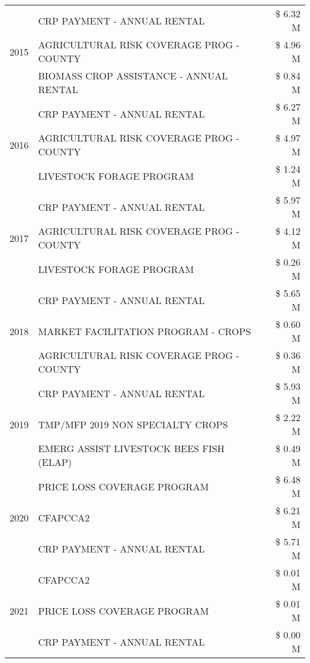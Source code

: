\begin{tabular}{llr}
\cline{1-3}
\multirow[t]{3}{*}{2015} & CRP PAYMENT - ANNUAL RENTAL & \$ 6.32 M \\
 & AGRICULTURAL RISK COVERAGE PROG - COUNTY & \$ 4.96 M \\
 & BIOMASS CROP ASSISTANCE - ANNUAL RENTAL & \$ 0.84 M \\
\cline{1-3}
\multirow[t]{3}{*}{2016} & CRP PAYMENT - ANNUAL RENTAL & \$ 6.27 M \\
 & AGRICULTURAL RISK COVERAGE PROG - COUNTY & \$ 4.97 M \\
 & LIVESTOCK FORAGE PROGRAM & \$ 1.24 M \\
\cline{1-3}
\multirow[t]{3}{*}{2017} & CRP PAYMENT - ANNUAL RENTAL & \$ 5.97 M \\
 & AGRICULTURAL RISK COVERAGE PROG - COUNTY & \$ 4.12 M \\
 & LIVESTOCK FORAGE PROGRAM & \$ 0.26 M \\
\cline{1-3}
\multirow[t]{3}{*}{2018} & CRP PAYMENT - ANNUAL RENTAL & \$ 5.65 M \\
 & MARKET FACILITATION PROGRAM - CROPS & \$ 0.60 M \\
 & AGRICULTURAL RISK COVERAGE PROG - COUNTY & \$ 0.36 M \\
\cline{1-3}
\multirow[t]{3}{*}{2019} & CRP PAYMENT - ANNUAL RENTAL & \$ 5.93 M \\
 & TMP/MFP 2019 NON SPECIALTY CROPS & \$ 2.22 M \\
 & EMERG ASSIST LIVESTOCK BEES FISH (ELAP) & \$ 0.49 M \\
\cline{1-3}
\multirow[t]{3}{*}{2020} & PRICE LOSS COVERAGE PROGRAM & \$ 6.48 M \\
 & CFAPCCA2 & \$ 6.21 M \\
 & CRP PAYMENT - ANNUAL RENTAL & \$ 5.71 M \\
\cline{1-3}
\multirow[t]{3}{*}{2021} & CFAPCCA2 & \$ 0.01 M \\
 & PRICE LOSS COVERAGE PROGRAM & \$ 0.01 M \\
 & CRP PAYMENT - ANNUAL RENTAL & \$ 0.00 M \\
\cline{1-3}
\bottomrule
\end{tabular}
